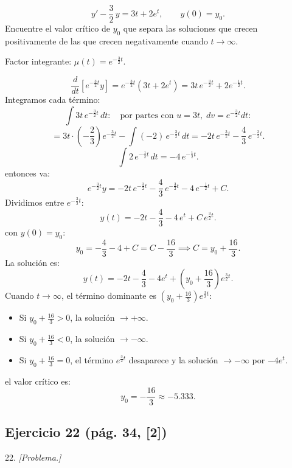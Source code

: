 \begin{respuesta}
\[
  y' - \frac{3}{2}\,y = 3t + 2e^t, \qquad y(0) = y_0.
\]
Encuentre el valor cr\'itico de $y_0$ que separa las soluciones que crecen positivamente de las que crecen negativamente cuando $t\to\infty$.

Factor integrante: $\mu(t) = e^{-\frac{3}{2}t}$.

\[
  \frac{d}{dt}\!\left[e^{-\frac{3}{2}t}y\right] = e^{-\frac{3}{2}t}(3t + 2e^t)
  = 3t\,e^{-\frac{3}{2}t} + 2e^{-\frac{1}{2}t}.
\]
Integramos cada t\'ermino:
\[
  \int 3t\,e^{-\frac{3}{2}t}\,dt:
  \quad\text{por partes con } u=3t,\;dv=e^{-\frac{3}{2}t}dt:
\]
\[
  = 3t\cdot\left(-\frac{2}{3}\right)e^{-\frac{3}{2}t} - \int (-2)\,e^{-\frac{3}{2}t}\,dt
  = -2t\,e^{-\frac{3}{2}t} - \frac{4}{3}\,e^{-\frac{3}{2}t}.
\]
\[
  \int 2\,e^{-\frac{1}{2}t}\,dt = -4\,e^{-\frac{1}{2}t}.
\]
entonces va:
\[
  e^{-\frac{3}{2}t}y = -2t\,e^{-\frac{3}{2}t} - \frac{4}{3}\,e^{-\frac{3}{2}t} - 4\,e^{-\frac{1}{2}t} + C.
\]
Dividimos entre $e^{-\frac{3}{2}t}$:
\[
  y(t) = -2t - \frac{4}{3} - 4\,e^{t} + C\,e^{\frac{3}{2}t}.
\]
con $y(0) = y_0$:
\[
  y_0 = -\frac{4}{3} - 4 + C = C - \frac{16}{3}
  \implies C = y_0 + \frac{16}{3}.
\]
La soluci\'on es:
\[
  y(t) = -2t - \frac{4}{3} - 4e^t + \left(y_0 + \frac{16}{3}\right)e^{\frac{3}{2}t}.
\]
Cuando $t\to\infty$, el t\'ermino dominante es $\left(y_0+\frac{16}{3}\right)e^{\frac{3}{2}t}$:
\begin{itemize}
  \item Si $y_0 + \tfrac{16}{3} > 0$, la soluci\'on $\to +\infty$.
  \item Si $y_0 + \tfrac{16}{3} < 0$, la soluci\'on $\to -\infty$.
  \item Si $y_0 + \tfrac{16}{3} = 0$, el t\'ermino $e^{\frac{3}{2}t}$ desaparece y la soluci\'on $\to -\infty$ por $-4e^t$.
\end{itemize}
el valor cr\'itico es:
\[
  \boxed{y_0 = -\frac{16}{3} \approx -5.333.}
\]
    \vspace{7cm}
\end{respuesta}

\subsection*{Ejercicio 22 \quad\normalfont\small(pág. 34, [2])}

\begin{enunciado}{22.}
    \textit{[Problema.]}
\end{enunciado}

